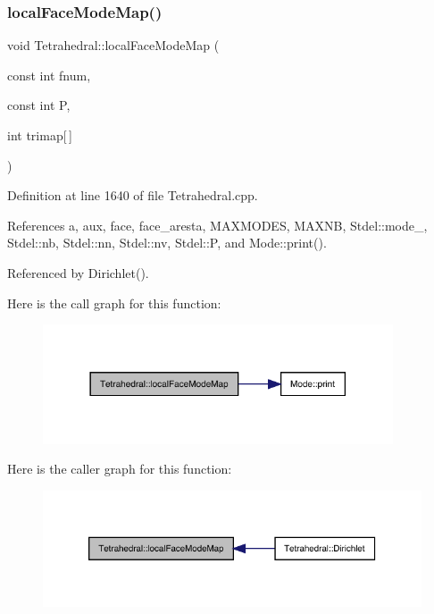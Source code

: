\mbox{\label{classTetrahedral_a5989cedeb4b852e77658ba761ac32519}} 
\subsubsection{\texorpdfstring{local\+Face\+Mode\+Map()}{localFaceModeMap()}}
{\footnotesize\ttfamily void Tetrahedral\+::local\+Face\+Mode\+Map (\begin{DoxyParamCaption}\item[{const int}]{fnum,  }\item[{const int}]{P,  }\item[{int}]{trimap\mbox{[}$\,$\mbox{]} }\end{DoxyParamCaption})}



Definition at line 1640 of file Tetrahedral.\+cpp.



References a, aux, face, face\+\_\+aresta, M\+A\+X\+M\+O\+D\+ES, M\+A\+X\+NB, Stdel\+::mode\+\_\+, Stdel\+::nb, Stdel\+::nn, Stdel\+::nv, Stdel\+::P, and Mode\+::print().



Referenced by Dirichlet().

Here is the call graph for this function\+:
\nopagebreak
\begin{figure}[H]
\begin{center}
\leavevmode
\includegraphics[width=294pt]{classTetrahedral_a5989cedeb4b852e77658ba761ac32519_cgraph}
\end{center}
\end{figure}
Here is the caller graph for this function\+:
\nopagebreak
\begin{figure}[H]
\begin{center}
\leavevmode
\includegraphics[width=326pt]{classTetrahedral_a5989cedeb4b852e77658ba761ac32519_icgraph}
\end{center}
\end{figure}
\mbox{\label{classTetrahedral_a15c9a6bcfaddf95eb77e8c56d4a62125}} 
